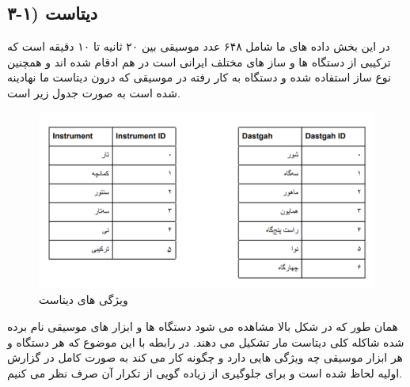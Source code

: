 \documentclass{article}
\begin{document}
\subsection{۳-۱) دیتاست}
در این بخش داده های ما شامل ۶۴۸ عدد موسیقی بین ۲۰ ثانیه تا ۱۰ دقیقه است که ترکیبی از دستگاه ها و ساز های مختلف ایرانی است در هم ادقام شده اند و همچنین نوع ساز استفاده شده و دستگاه به کار رفته در موسیقی که درون  دیتاست ما نهادینه شده است به صورت جدول زیر است.\newline
\begin{figure}[h]
	\centering
	\includegraphics[width=0.7\linewidth]{Photo/10}
	\caption[ویژگی های دیتاست]{ویژگی های دیتاست}
	\label{fig:10}
\end{figure}\newline
همان طور که در شکل بالا مشاهده می شود دستگاه ها و ابزار های موسیقی نام برده شده شاکله کلی دیتاست مار تشکیل می دهند.\newline
در رابطه با این موضوع که هر دستگاه و هر ابزار موسیقی چه ویژگی هایی دارد و چگونه کار می کند به صورت کامل در گزارش اولیه لحاظ شده است و برای جلوگیری از زیاده گویی از تکرار آن صرف نظر می کنیم.\newline
\end{document}
